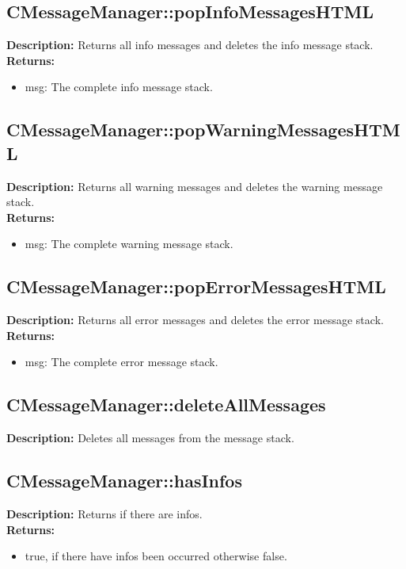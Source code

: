 \subsection{CMessageManager::popInfoMessagesHTML}
\textbf{Description:} Returns all info messages and deletes the info message stack.\\
\textbf{Returns:}
\begin{itemize}
\item msg: The complete info message stack.
\end{itemize}

\subsection{CMessageManager::popWarningMessagesHTML}
\textbf{Description:} Returns all warning messages and deletes the warning message stack.\\
\textbf{Returns:}
\begin{itemize}
\item msg: The complete warning message stack.
\end{itemize}

\subsection{CMessageManager::popErrorMessagesHTML}
\textbf{Description:} Returns all error messages and deletes the error message stack.\\
\textbf{Returns:}
\begin{itemize}
\item msg: The complete error message stack.
\end{itemize}

\subsection{CMessageManager::deleteAllMessages}
\textbf{Description:} Deletes all messages from the message stack.\\

\subsection{CMessageManager::hasInfos}
\textbf{Description:} Returns if there are infos.\\
\textbf{Returns:}
\begin{itemize}
\item true, if there have infos been occurred otherwise false.
\end{itemize}

